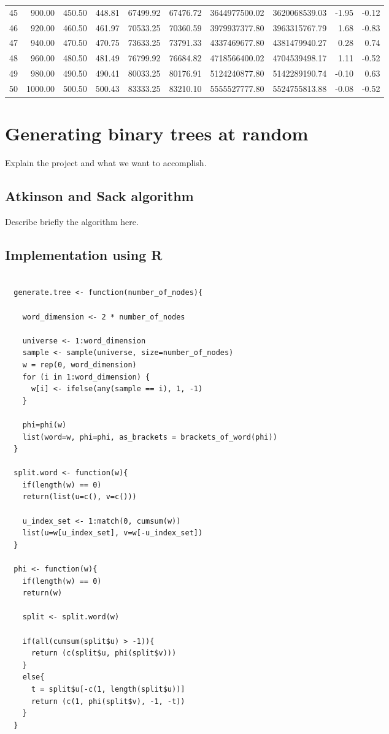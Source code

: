 \documentclass[twoside,openright,titlepage,fleqn,
	headinclude,11pt,a4paper,BCOR5mm,footinclude
	]{scrbook}
\begin{document}
\begin{table}[ht]
\begin{center}
{\begin{tabular}{rrrrrrrrrr}
        45 & 900.00 & 450.50 & 448.81 & 67499.92 & 67476.72 & 3644977500.02 & 3620068539.03 & -1.95 & -0.12 \\ 
        46 & 920.00 & 460.50 & 461.97 & 70533.25 & 70360.59 & 3979937377.80 & 3963315767.79 & 1.68 & -0.83 \\ 
        47 & 940.00 & 470.50 & 470.75 & 73633.25 & 73791.33 & 4337469677.80 & 4381479940.27 & 0.28 & 0.74 \\ 
        48 & 960.00 & 480.50 & 481.49 & 76799.92 & 76684.82 & 4718566400.02 & 4704539498.17 & 1.11 & -0.52 \\ 
        49 & 980.00 & 490.50 & 490.41 & 80033.25 & 80176.91 & 5124240877.80 & 5142289190.74 & -0.10 & 0.63 \\ 
        50 & 1000.00 & 500.50 & 500.43 & 83333.25 & 83210.10 & 5555527777.80 & 5524755813.88 & -0.08 & -0.52 \\ 
        \hline
      \end{tabular}
    }
  \end{center}
\end{table}

\chapter{Generating binary trees at random}
Explain the project and what we want to accomplish.

\section{Atkinson and Sack algorithm}
Describe briefly the algorithm here.

\section{Implementation using R}

\begin{lstlisting}

  generate.tree <- function(number_of_nodes){

    word_dimension <- 2 * number_of_nodes
    
    universe <- 1:word_dimension
    sample <- sample(universe, size=number_of_nodes)
    w = rep(0, word_dimension)
    for (i in 1:word_dimension) {
      w[i] <- ifelse(any(sample == i), 1, -1)
    }
    
    phi=phi(w)
    list(word=w, phi=phi, as_brackets = brackets_of_word(phi))
  }

  split.word <- function(w){
    if(length(w) == 0)
    return(list(u=c(), v=c()))
    
    u_index_set <- 1:match(0, cumsum(w))
    list(u=w[u_index_set], v=w[-u_index_set])
  }

  phi <- function(w){
    if(length(w) == 0)
    return(w)
    
    split <- split.word(w) 
    
    if(all(cumsum(split$u) > -1)){
      return (c(split$u, phi(split$v)))
    }
    else{
      t = split$u[-c(1, length(split$u))]
      return (c(1, phi(split$v), -1, -t))
    }
  }
\end{lstlisting}
\end{document}
